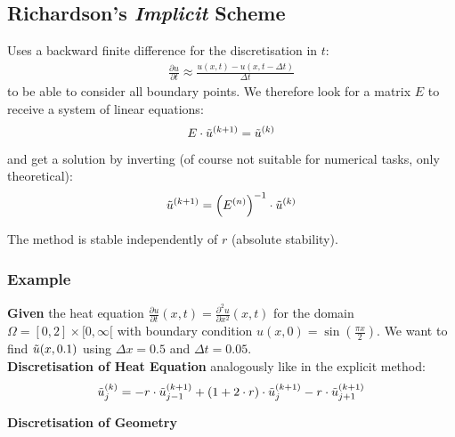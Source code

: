 \subsection{Richardson's \emph{Implicit} Scheme}

Uses a backward finite difference for the discretisation in $t$:
\begin{align*}
	\frac{\partial u}{\partial t} \approx \frac{u(x,t) - u(x, t-\Delta t)}{\Delta t}
\end{align*}
to be able to consider all boundary points.
We therefore look for a matrix $E$ to receive a system of linear equations:
\begin{align*}
	E\cdot \tilde{u}^{(k+1)} = \tilde{u}^{(k)}
\end{align*}
and get a solution by inverting (of course not suitable for numerical tasks, only theoretical):
\begin{align*}
	\tilde{u}^{(k+1)} = \left(E^{(n)}\right)^{-1}\cdot\tilde{u}^{(k)}
\end{align*}

The method is stable independently of $r$ (absolute stability).

\subsubsection{Example}

\textbf{Given} the heat equation $\frac{\partial u}{\partial t}(x,t) = \frac{\partial^2 u}{\partial x^2}(x,t)$
for the domain $\Omega = [0,2]\times [0, \infty[$ with boundary condition
$u(x,0) = \sin\left(\frac{\pi x}{2}\right)$. We want to find $\tilde{u}(x,0.1)$ using $\Delta x = 0.5$ and $\Delta t = 0.05$.
\\[1em]
\textbf{Discretisation of Heat Equation}
analogously like in the explicit method:
\begin{align*}
	\tilde{u}_{j}^{(k)}=-r\cdot\tilde{u}_{j-1}^{(k+1)}+(1+2\cdot r)\cdot\tilde{u}_{j}^{(k+1)}-r\cdot\tilde{u}_{j+1}^{(k+1)}
\end{align*}

\textbf{Discretisation of Geometry}


